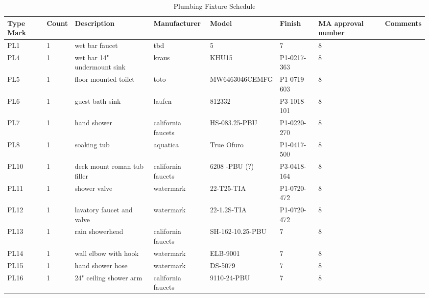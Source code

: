 \documentclass{article}
\begin{document}
\begin{sidewaystable}[h!]
\begin{center}
\caption{\large Plumbing Fixture Schedule}
\begin{tabular}{l|l|l|l|l|l|l|l}
\textbf{Type Mark} & \textbf{Count} & \textbf{Description} & \textbf{Manufacturer} & \textbf{Model} & \textbf{Finish} & \textbf{MA approval number}  & \textbf{Comments} \\
\hline
\hline
PL1   & 1  & wet bar faucet & tbd & 5 & 7 & 8 \\ 
\hline
PL4   & 1  & wet bar 14" undermount sink & kraus & KHU15 & P1-0217-363 & 8 \\ 
\hline
PL5   & 1  & floor mounted toilet & toto & MW6463046CEMFG & P1-0719-603 & 8 \\
\hline
PL6   & 1  & guest bath sink & laufen & 812332 & P3-1018-101 & 8 \\
\hline
PL7   & 1  & hand shower & california faucets & HS-083.25-PBU & P1-0220-270 & 8 \\
\hline
PL8   & 1  & soaking tub & aquatica & True Ofuro & P1-0417-500 & 8 \\
\hline
PL10 & 1  & deck mount roman tub filler & california faucets & 6208 -PBU (?) & P3-0418-164  & 8 \\
\hline
PL11 & 1  & shower valve & watermark & 22-T25-TIA  & P1-0720-472  & 8 \\
\hline
PL12 & 1  & lavatory faucet and valve & watermark & 22-1.2S-TIA & P1-0720-472 & 8 \\
\hline
PL13 & 1  & rain showerhead & california faucets & SH-162-10.25-PBU & 7 & 8 \\
\hline
PL14 & 1  & wall elbow with hook & watermark & ELB-9001 & 7 & 8 \\
\hline
PL15 & 1  & hand shower hose & watermark & DS-5079  & 7 & 8 \\
\hline
PL16 & 1  & 24" ceiling shower arm & california faucets & 9110-24-PBU  & 7 & 8 \\

\end{tabular}
\end{center}
\end{sidewaystable}
\end{document}
